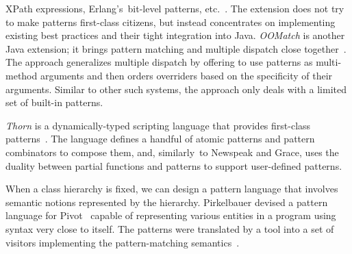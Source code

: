 XPath expressions, Erlang's~bit-level patterns, etc.~\cite{padl08}. The extension 
does not try to make patterns first-class citizens, but instead concentrates on 
implementing existing best practices and their tight integration into Java. %
%
\emph{OOMatch} is another Java extension; it brings pattern matching and multiple 
dispatch close together~\cite{OOMatch07thesis}. The approach generalizes 
multiple dispatch by offering to use patterns as multi-method arguments and then 
orders overriders based on the specificity of their arguments. %
Similar to other such systems, the approach only deals with a limited set of built-in patterns.

\emph{Thorn} is a dynamically-typed scripting language that provides first-class 
patterns~\cite{Thorn2012}. %
The language defines a handful 
of atomic patterns and pattern combinators to compose them, and, similarly~to 
Newspeak and Grace, uses the duality between partial functions and patterns to 
support user-defined patterns. %


When a class hierarchy is fixed, we can design a pattern language that involves 
semantic notions represented by the hierarchy. Pirkelbauer devised a pattern 
language for Pivot~\cite{Pivot09} capable of representing various entities in a 
\Cpp{} program using syntax very close to \Cpp{} itself. The patterns were 
translated by a tool into a set of visitors implementing the
pattern-matching semantics~\cite{PirkelbauerThesis}. %
